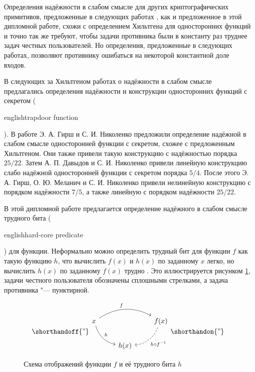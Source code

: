 \documentclass[oneside, a4paper]{article}
\theoremstyle{definition}
\theoremstyle{remark}
\begin{document}
Определения надёжности в слабом смысле для других криптографических примитивов,
предложенные в следующих работах \cite{HN09,DN11,hirsch_milanich_nikolenko},
как и предложенное в этой дипломной работе, схожи с определением Хильтгена для
односторонних функций и точно так же требуют, чтобы задачи противника были в
константу раз труднее задач честных пользователей. Но определения, предложенные
в следующих работах, позволяют противнику ошибаться на некоторой константной
доле входов.

В следующих за Хильтгеном работах о надёжности в слабом смысле предлагались
определения надёжности и конструкции односторонних функций с секретом
(\begin{foreignlanguage}{english}trapdoor function\end{foreignlanguage}). В
работе \cite{HN09} Э. А. Гирш и С. И. Николенко предложили определение надёжной
в слабом смысле односторонней функции с секретом, схожее с предложенным
Хильтгеном. Они также привели такую конструкцию с надёжностью порядка $25/22$.
Затем \cite{DN11} А. П. Давыдов и С. И. Николенко привели линейную конструкцию
слабо надёжной односторонней функции с секретом порядка $5/4$. После этого Э. А.
Гирш, О. Ю. Меланич и С. И. Николенко \cite{hirsch_milanich_nikolenko} привели
нелинейную конструкцию с порядком надёжности $7/5$, а также линейную с порядком
надёжности $25/22$.

В этой дипломной работе предлагается определение надёжного в слабом
смысле трудного бита (\begin{foreignlanguage}{english}hard-core
predicate\end{foreignlanguage}) для функции. Неформально можно определить
трудный бит для функции $f$ как такую функцию $h$, что вычислить $f(x)$ и
$h(x)$ по заданному $x$ легко, но вычислить $h(x)$ по заданному $f(x)$ трудно
\cite{goldreich}. Это иллюстрируется рисунком \ref{fig_hp}, задачи честного
пользователя обозначены сплошными стрелками, а задача противника "---
пунктирной.

\begin{figure}[h]
\[
\shorthandoff{"}
\begin{tikzcd}
x \arrow[rr, bend left, "f"] \arrow[rd, bend right, "h"] & ~ & f(x) \arrow[ld, bend left, dashrightarrow, "h \circ f^{-1}"] \\
~ & h(x) & ~
\end{tikzcd}
\shorthandon{"}
\]
\caption{Схема отображений функции $f$ и её трудного бита $h$}
\label{fig_hp}
\end{figure}
\end{document}
